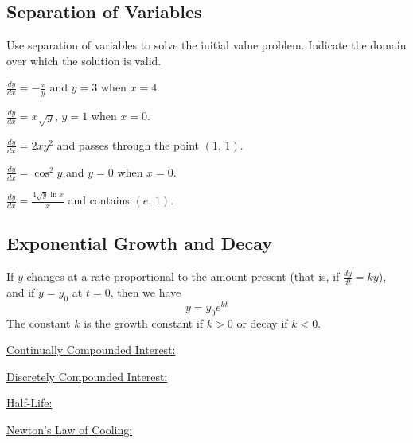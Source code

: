 \subsection*{Separation of Variables}
Use separation of variables to solve the initial value problem. Indicate the domain over which the solution is valid.
\begin{questions}
    \question $\displaystyle\frac{dy}{dx}=-\frac{x}{y}$ and $y=3$ when $x=4$.
    
    \question $\displaystyle\frac{dy}{dx}=x\sqrt{y}$, $y=1$ when $x=0$.
    
    \question$\displaystyle\frac{dy}{dx}=2xy^2$ and passes through the point $(1,\,1)$.
    
    \question$\displaystyle\frac{dy}{dx}=\cos^2 y$ and $y=0$ when $x=0$.
    
    \question$\displaystyle\frac{dy}{dx}=\frac{4\sqrt{y}\ln x}{x}$ and contains $(e,\,1)$.
\end{questions}

\newpage

\subsection*{Exponential Growth and Decay}
If $y$ changes at a rate proportional to the amount present (that is, if $\displaystyle\frac{dy}{dt}=ky$), and if $y=y_0$ at $t=0$, then we have 
\[y=y_0 e^{kt}\]
The constant $k$ is the growth constant if $k>0$ or decay if $k<0$.

\begin{minipage}{.45\linewidth}
    \underline{Continually Compounded Interest:}
\end{minipage}
\hfill
\begin{minipage}{.45\linewidth}
    \underline{Discretely Compounded Interest:}
\end{minipage}

\vspace{1in}

\begin{minipage}{.45\linewidth}
    \underline{Half-Life:}
\end{minipage}
\hfill
\begin{minipage}{.45\linewidth}
    \underline{Newton's Law of Cooling:}
\end{minipage}

